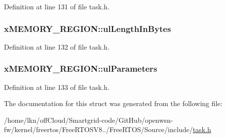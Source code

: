 Definition at line 131 of file task.\+h.

\subsubsection[{\texorpdfstring{ul\+Length\+In\+Bytes}{ulLengthInBytes}}]{ x\+M\+E\+M\+O\+R\+Y\+\_\+\+R\+E\+G\+I\+O\+N\+::ul\+Length\+In\+Bytes}\hypertarget{structx_m_e_m_o_r_y___r_e_g_i_o_n_a97e59578d3c4c46270d33e7206258a65}{}\label{structx_m_e_m_o_r_y___r_e_g_i_o_n_a97e59578d3c4c46270d33e7206258a65}


Definition at line 132 of file task.\+h.

\subsubsection[{\texorpdfstring{ul\+Parameters}{ulParameters}}]{ x\+M\+E\+M\+O\+R\+Y\+\_\+\+R\+E\+G\+I\+O\+N\+::ul\+Parameters}\hypertarget{structx_m_e_m_o_r_y___r_e_g_i_o_n_a6ba180553e9a318f23acc5f4664934e3}{}\label{structx_m_e_m_o_r_y___r_e_g_i_o_n_a6ba180553e9a318f23acc5f4664934e3}


Definition at line 133 of file task.\+h.



The documentation for this struct was generated from the following file\+:\begin{DoxyCompactItemize}
\item 
/home/lkn/off\+Cloud/\+Smartgrid-\/code/\+Git\+Hub/openwsn-\/fw/kernel/freertos/\+Free\+R\+T\+O\+S\+V8../\+Free\+R\+T\+O\+S/\+Source/include/\hyperlink{task_8h}{task.\+h}\end{DoxyCompactItemize}
